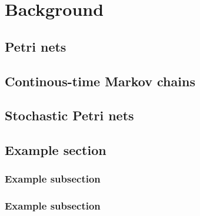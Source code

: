 \chapter{Background}
\label{chap:background}

\section{Petri nets}

\section{Continous-time Markov chains}

\blindtext

\citet{dayar2012analyzing}

\section{Stochastic Petri nets}

\blindmathtrue
\renewcommand*{\blindmarkup}{\emph}
\Blindtext[2]

\begin{thm}
  \blindtext[1]
\end{thm}

\section{Example section}

\Blindtext[3]

\subsection{Example subsection}

\blindtext[1]

\subsection{Example subsection}

\blindmathfalse
\blindtext[1]
\blinditemize
\Blindtext[5]
